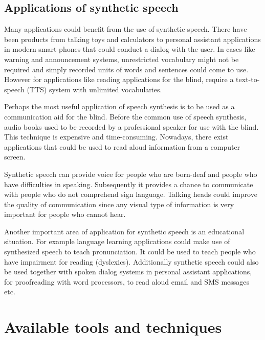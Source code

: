 \documentclass[11pt,a4paper,oneside,article]{memoir}
\begin{document}
\section{Applications of synthetic speech}
Many applications could benefit from the use of synthetic speech. There have been products from talking toys and calculators to personal assistant applications in modern smart phones that could conduct a dialog with the user. In cases like warning and announcement systems, unrestricted vocabulary might not be required and simply recorded units of words and sentences could come to use. However for applications like reading applications for the blind, require a text-to-speech (TTS) system with unlimited vocabularies. \cite{hut}

Perhaps the most useful application of speech synthesis is to be used as a communication aid for the blind. Before the common use of speech synthesis, audio books used to be recorded by a professional speaker for use with the blind. This technique is expensive and time-consuming. Nowadays, there exist applications that could be used to read aloud information from a computer screen. \cite{hut}

Synthetic speech can provide voice for people who are born-deaf and people who have difficulties in speaking. Subsequently it provides a chance to communicate with people who do not comprehend sign language. Talking heads could improve the quality of communication since any visual type of information is very important for people who cannot hear. \cite{hut}

Another important area of application for synthetic speech is an educational situation. For example language learning applications could make use of synthesized speech to teach pronunciation. It could be used to teach people who have impairment for reading (dyslexics). Additionally synthetic speech could also be used together with spoken dialog systems in personal assistant applications, for proofreading with word processors, to read aloud email and SMS messages etc. \cite{hut}



\clearpage
\chapter{Available tools and techniques}
\end{document}
